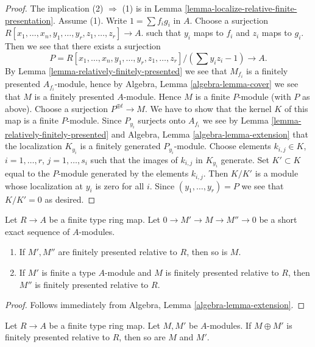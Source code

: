 \begin{proof}
The implication (2) $\Rightarrow$ (1) is in
Lemma \ref{lemma-localize-relative-finite-presentation}.
Assume (1). Write $1 = \sum f_ig_i$ in $A$.
Choose a surjection
$R[x_1, \ldots, x_n, y_1, \ldots, y_r, z_1, \ldots, z_r] \to A$.
such that $y_i$ maps to $f_i$ and $z_i$ maps to $g_i$. Then we
see that there exists a surjection
$$
P = R[x_1, \ldots, x_n, y_1, \ldots, y_r, z_1, \ldots, z_r]/(\sum y_iz_i - 1)
\longrightarrow
A.
$$
By
Lemma \ref{lemma-relatively-finitely-presented}
we see that $M_{f_i}$ is a finitely presented $A_{f_i}$-module, hence by
Algebra, Lemma \ref{algebra-lemma-cover}
we see that $M$ is a finitely presented $A$-module.
Hence $M$ is a finite $P$-module (with $P$ as above).
Choose a surjection $P^{\oplus t} \to M$.
We have to show that the kernel $K$ of this map is a finite
$P$-module. Since $P_{y_i}$ surjects onto
$A_{f_i}$ we see by
Lemma \ref{lemma-relatively-finitely-presented}
and
Algebra, Lemma \ref{algebra-lemma-extension}
that the localization $K_{y_i}$ is a finitely generated
$P_{y_i}$-module. Choose elements
$k_{i, j} \in K$, $i = 1, \ldots, r$, $j = 1, \ldots, s_i$ such
that the images of $k_{i, j}$ in $K_{y_i}$ generate.
Set $K' \subset K$ equal to the $P$-module
generated by the elements $k_{i, j}$. Then $K/K'$ is a module
whose localization at $y_i$ is zero for all $i$. Since $(y_1, \ldots, y_r) = P$
we see that $K/K' = 0$ as desired.
\end{proof}

\begin{lemma}
\label{lemma-ses-relatively-finite-presentation}
Let $R \to A$ be a finite type ring map. Let $0 \to M' \to M \to M'' \to 0$
be a short exact sequence of $A$-modules.
\begin{enumerate}
\item If $M', M''$ are finitely presented relative to $R$, then so is $M$.
\item If $M'$ is finite a type $A$-module and $M$ is finitely presented
relative to $R$, then $M''$ is finitely presented relative to $R$.
\end{enumerate}
\end{lemma}

\begin{proof}
Follows immediately from
Algebra, Lemma \ref{algebra-lemma-extension}.
\end{proof}

\begin{lemma}
\label{lemma-sum-relatively-finite-presentation}
Let $R \to A$ be a finite type ring map.
Let $M, M'$ be $A$-modules. If $M \oplus M'$ is
finitely presented relative to $R$, then so are $M$ and $M'$.
\end{lemma}

